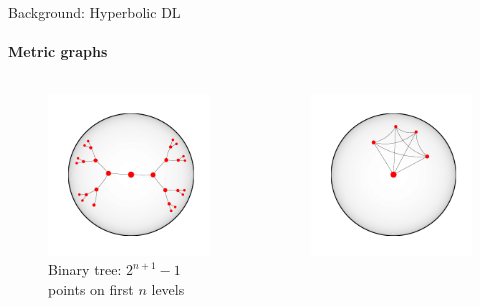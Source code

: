 \documentclass{beamer}
\begin{document}
\begin{frame}{Background: Hyperbolic DL}
    \framesubtitle{Metric graphs}

    \begin{columns}
        \begin{column}{.45\linewidth}
            \begin{figure}\centering
                \includegraphics[width=.95\linewidth]{art/h-binary-tree.pdf}
                \caption{Binary tree: \( 2^{n+1}-1 \)
                points on first \( n \) levels}
            \end{figure}
        \end{column}
        \begin{column}{.45\linewidth}
            \begin{figure}\centering
                \includegraphics[width=.95\linewidth]{art/h-clique.pdf}

\end{figure}
\end{column}
\end{columns}
\end{frame}
\end{document}
